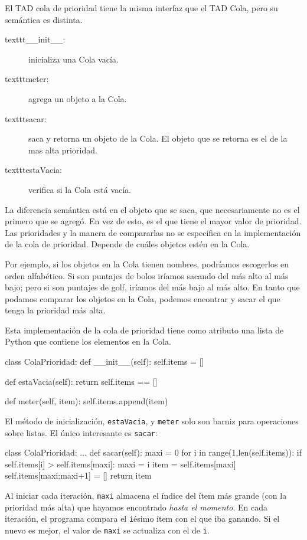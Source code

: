  

El TAD cola de prioridad tiene la misma interfaz que el TAD Cola,
pero su semántica es distinta.
\begin{description}
\item [{texttt{\_\_init\_\_}:}] inicializa una Cola vacía.
\item [{texttt{meter}:}] agrega un objeto a la Cola.
\item [{texttt{sacar}:}] saca y retorna un objeto de la Cola. El objeto
que se retorna es el de la mas alta prioridad.
\item [{texttt{estaVacia}:}] verifica si la Cola está vacía.
\end{description}
La diferencia semántica está en el objeto que se saca, que necesariamente
no es el primero que se agregó. En vez de esto, es el que tiene el
mayor valor de prioridad. Las prioridades y la manera de compararlas
no se especifica en la implementación de la cola de prioridad. Depende
de cuáles objetos estén en la Cola.

Por ejemplo, si los objetos en la Cola tienen nombres, podríamos escogerlos
en orden alfabético. Si son puntajes de bolos iríamos sacando del
más alto al más bajo; pero si son puntajes de golf, iríamos del más
bajo al más alto. En tanto que podamos comparar los objetos en la
Cola, podemos encontrar y sacar el que tenga la prioridad más alta.

Esta implementación de la cola de prioridad tiene como atributo una
lista de Python que contiene los elementos en la Cola.

\beforeverb 
\begin{pythoncode}
class ColaPrioridad:
  def __init__(self):
    self.items = []

  def estaVacia(self):
    return self.items == []

  def meter(self, item):
    self.items.append(item)
\end{pythoncode}
\afterverb El método de inicialización, \texttt{estaVacia}, y \texttt{meter}
solo son barniz para operaciones sobre listas. El único interesante
es \texttt{sacar}:

\beforeverb 
\begin{pythoncode}
class ColaPrioridad:
  ...
  def sacar(self):
    maxi = 0
    for i in range(1,len(self.items)):
      if self.items[i] > self.items[maxi]:
        maxi = i
    item = self.items[maxi]
    self.items[maxi:maxi+1] = []
    return item
\end{pythoncode}
\afterverb Al iniciar cada iteración, \texttt{maxi} almacena el índice
del ítem más grande (con la prioridad más alta) que hayamos encontrado
{\em hasta el momento}. En cada iteración, el programa compara
el \texttt{i}ésimo ítem con el que iba ganando. Si el nuevo es mejor,
el valor de \texttt{maxi} se actualiza con el de \texttt{i}.

